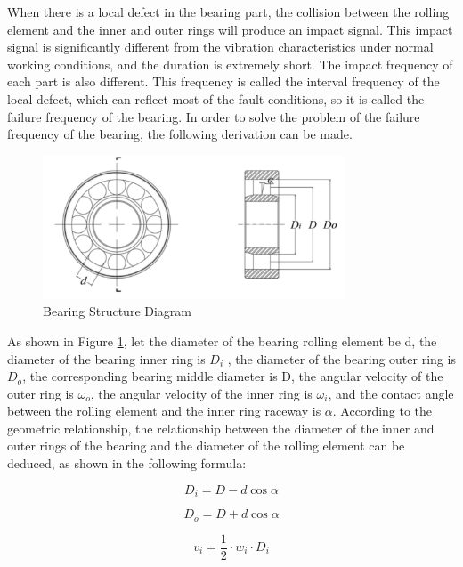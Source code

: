 \documentclass{article}
\begin{document}
When there is a local defect in the bearing part, the collision between the rolling element and the inner and outer rings will produce an impact signal. This impact signal is significantly different from the vibration characteristics under normal working conditions, and the duration is extremely short. The impact frequency of each part is also different. This frequency is called the interval frequency of the local defect, which can reflect most of the fault conditions, so it is called the failure frequency of the bearing. In order to solve the problem of the failure frequency of the bearing, the following derivation can be made.
\begin{figure}
    \centering
    \includegraphics[width=0.8\textwidth]{./轴承结构简图.png}
    \caption{Bearing Structure Diagram}
    \label{fig:Bearing-structure}
\end{figure}

As shown in Figure \ref{fig:Bearing-structure}, let the diameter of the bearing rolling element be d, the diameter of the bearing inner ring is $D_i$ , the diameter of the bearing outer ring is $D_o$, the corresponding bearing middle diameter is D, the angular velocity of the outer ring is $\omega _o$, the angular velocity of the inner ring is $\omega_i$, and the contact angle between the rolling element and the inner ring raceway is $\alpha $. According to the geometric relationship, the relationship between the diameter of the inner and outer rings of the bearing and the diameter of the rolling element can be deduced, as shown in the following formula:

\begin{equation}
    D_i = D - d \cos\alpha
    \label{eq:2.1}
\end{equation}

\begin{equation}
    D_o = D + d \cos\alpha
    \label{eq:2.2}
\end{equation}


\begin{equation}
    v_i = \frac{1}{2} \cdot w_i \cdot D_i
    \label{eq:2.3}
\end{equation}
\end{document}
